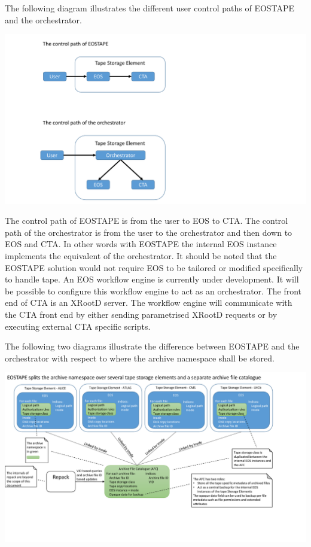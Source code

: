 \documentclass{article}
\begin{document}
The following diagram illustrates the different user control paths of EOSTAPE and the orchestrator.

\includegraphics[width=\linewidth]{EOSTAPE_orchestrator_control_paths}

The control path of EOSTAPE is from the user to EOS to CTA.  The control path of the orchestrator is from the user to the orchestrator and then down to EOS and CTA.  In other words with EOSTAPE the internal EOS instance implements the equivalent of the orchestrator.  It should be noted that the EOSTAPE solution would not require EOS to be tailored or modified specifically to handle tape.  An EOS workflow engine is currently under development.  It will be possible to configure this workflow engine to act as an orchestrator.  The front end of CTA is an XRootD server.  The workflow engine will communicate with the CTA front end by either sending parametrised XRootD requests or by executing external CTA specific scripts.

\newpage
The following two diagrams illustrate the difference between EOSTAPE and the orchestrator with respect to where the archive namespace shall be stored.

\includegraphics[width=\linewidth, trim=0mm 40mm 35mm 0mm]{EOSTAPE_namespaces}
\end{document}
